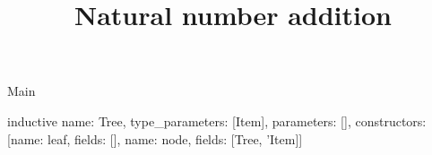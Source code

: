 \begin{lexlean}{Main}
\title{Natural number addition}
\begin{semanticmodule}
inductive{
  name: Tree,
  type_parameters: [Item],
  parameters: [],
  constructors: [{name: leaf, fields: []}, {name: node, fields: [Tree, 'Item]}]
}
\end{semanticmodule}
\end{lexlean}

